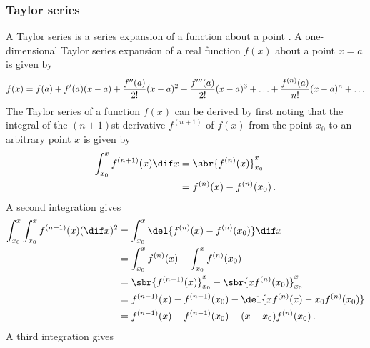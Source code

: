 \subsubsection{Taylor series}
A Taylor series is a series expansion of a function about a point \parencite{Weisstein2017}.  A one-dimensional Taylor series expansion of a real function $f(x)$ about a point $x = a$ is given by
\begin{equation*}
  \label{eq:tayse}
  f(x)=f(a)+f'(a)(x-a)+\frac{f''(a)}{2!}(x-a)^2+\frac{f'''(a)}{2!}(x-a)^3+\mathellipsis+\frac{f^{(n)}(a)}{n!}(x-a)^n+\mathellipsis
\end{equation*}
The Taylor series of a function $f(x)$ can be derived by first noting that the integral of the $(n+1)$st derivative $f^{(n+1)}$ of $f(x)$ from the point $x_0$ to an arbitrary point $x$ is given by
\begin{align*}
  \int_{x_0}^x{f^{(n+1)}(x)}\dif x &= \sbr{ f^{(n)}(x) }_{x_0}^x \\
                               &= f^{(n)}(x) - f^{(n)}(x_0) \, .
\end{align*}
A second integration gives
\begin{align*}
  \int_{x_0}^x\int_{x_0}^x{f^{(n+1)}(x)} (\dif x)^2 &= \int_{x_0}^x{\del{ f^{(n)}(x) - f^{(n)}(x_0) }}\dif x \\
                                    &= \int_{x_0}^x{f^{(n)}(x)} - \int_{x_0}^x{f^{(n)}(x_0)} \\
                                    &= \sbr{ f^{(n-1)}(x) }_{x_0}^x - \sbr{ x f^{(n)}(x_0) }_{x_0}^x \\
                                    &= f^{(n-1)}(x) - f^{(n-1)}(x_0) - \del{ x f^{(n)}(x) - x_0 f^{(n)}(x_0) } \\
                                    &= f^{(n-1)}(x) - f^{(n-1)}(x_0) - (x - x_0) f^{(n)}(x_0) \, .
\end{align*}
A third integration gives
